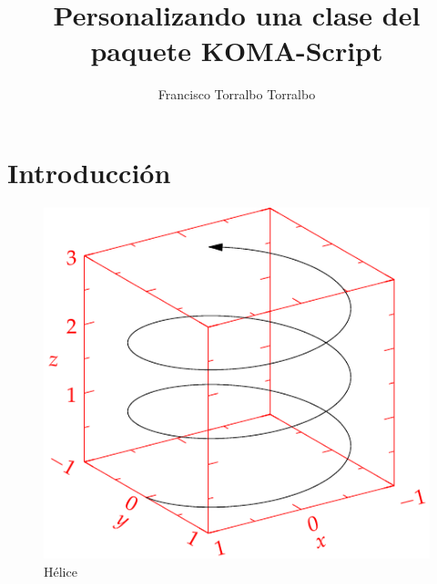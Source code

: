 \documentclass{scrartcl}
\title{Personalizando una clase del paquete KOMA-Script}
\author{Francisco Torralbo Torralbo}
\begin{document}
\maketitle

\section{Introducción}
\begin{figure}
\centering
\includegraphics{helix.pdf}
\caption{Hélice}
\end{figure}
\end{document}
